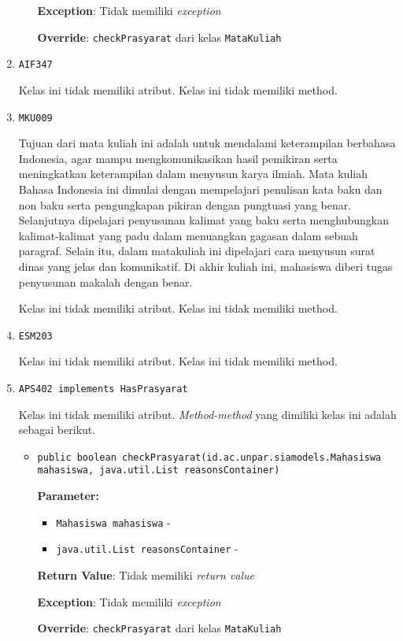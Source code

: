 \documentclass{article}
\begin{document}
\begin{enumerate}
\begin{itemize}
\textbf{Exception}: Tidak memiliki \textit{exception}

\textbf{Override}: \texttt{checkPrasyarat} dari kelas \texttt{MataKuliah}

\end{itemize}
\item \texttt{AIF347}



Kelas ini tidak memiliki atribut. Kelas ini tidak memiliki method. \item \texttt{MKU009}

Tujuan dari mata kuliah ini adalah untuk mendalami keterampilan berbahasa Indonesia, agar 
 mampu mengkomunikasikan hasil pemikiran serta meningkatkan keterampilan dalam menyusun karya
 ilmiah. Mata kuliah Bahasa Indonesia ini dimulai dengan mempelajari penulisan kata baku dan 
 non baku serta pengungkapan pikiran dengan pungtuasi yang benar. Selanjutnya dipelajari 
 penyusunan kalimat yang baku serta menghubungkan kalimat-kalimat yang padu dalam menuangkan 
 gagasan dalam sebuah paragraf. Selain itu, dalam matakuliah ini dipelajari cara menyusun
 surat dinas yang jelas dan komunikatif. Di akhir kuliah ini, mahasiswa diberi tugas
 penyusunan makalah dengan benar.

Kelas ini tidak memiliki atribut. Kelas ini tidak memiliki method. \item \texttt{ESM203}



Kelas ini tidak memiliki atribut. Kelas ini tidak memiliki method. \item \texttt{APS402 implements HasPrasyarat}



Kelas ini tidak memiliki atribut. \textit{Method-method} yang dimiliki kelas ini adalah sebagai berikut.
\begin{itemize}
\item \texttt{public boolean checkPrasyarat(id.ac.unpar.siamodels.Mahasiswa mahasiswa, java.util.List reasonsContainer)}

\textbf{Parameter:}
\begin{itemize}
\item \texttt{Mahasiswa mahasiswa} - 
\item \texttt{java.util.List reasonsContainer} - 
\end{itemize}
\textbf{Return Value}: Tidak memiliki \textit{return value}

\textbf{Exception}: Tidak memiliki \textit{exception}

\textbf{Override}: \texttt{checkPrasyarat} dari kelas \texttt{MataKuliah}


\end{itemize}
\end{enumerate}
\end{document}

